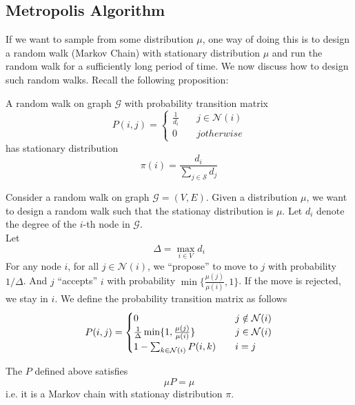     \subsection{Metropolis Algorithm}
        If we want to sample from some distribution $\mu$, one way of doing this is to design a random walk (Markov Chain) with stationary distribution $\mu$ and run the random walk for a sufficiently long period of time. We now discuss how to design such random walks. Recall the following proposition:
        \begin{proposition}
            A random walk on graph $\mathcal{G}$ with probability transition matrix
            \[P(i,j) = 
            \begin{cases}
                \frac{1}{d_i} \quad &j \in \mathcal{N}(i)\\
                0 \quad &j otherwise
            \end{cases}
            \]
            has stationary distribution
            \[ \pi(i) = \frac{d_i}{\sum_{j\in\mathcal{S}}d_j} \]
        \end{proposition}
        Consider a random walk on graph $\mathcal{G} = (V, E)$. Given a distribution $\mu$, we want to design a random walk such that the stationay distribution is $\mu$. Let $d_i$ denote the degree of the $i$-th node in $\mathcal{G}$.\\
        Let
        \[ \Delta = \max_{i \in V} d_i \]
        For any node $i$, for all $j \in \mathcal{N}(i)$, we ``propose'' to move to $j$ with probability $1/\Delta$. And $j$ ``accepts'' $i$ with probability $\min \{\frac{\mu(j)}{\mu(i)}, 1\}$. If the move is rejected, we stay in $i$. We define the probability transition matrix as follows
        \begin{equation}\notag
            P(i, j) = 
            \begin{cases}
                0 \quad & j \notin \mathcal{N}(i)\\
                \frac{1}{\Delta}\min\{1, \frac{\mu(j)}{\mu(i)}\} \quad &j \in \mathcal{N}(i)\\
                1 - \sum_{k\in\mathcal{N}(i)} P(i,k) \quad & i = j
            \end{cases}
        \end{equation}
        \begin{proposition}
            The $P$ defined above satisfies
            \[ \mu P = \mu \]
            i.e. it is a Markov chain with stationay distribution $\pi$.
        \end{proposition}
